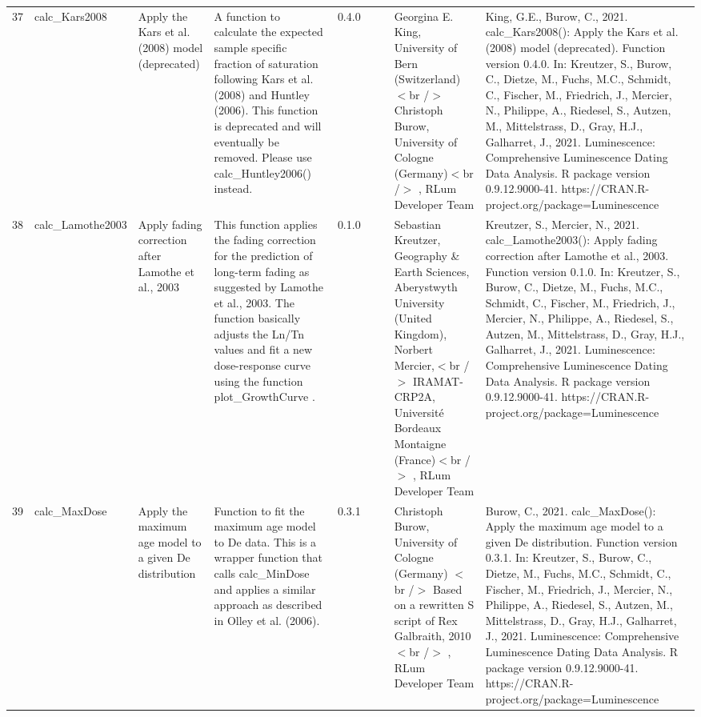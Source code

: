 \begin{table}[ht]
\begin{tabular}{rllllllll}
 \\ 
  37 & calc\_Kars2008 & Apply the Kars et al. (2008) model (deprecated) & A function to calculate the expected sample specific fraction of saturation following Kars et al. (2008) and Huntley (2006). This function is deprecated and will eventually be removed. Please use  calc\_Huntley2006()  instead. & 0.4.0
 &  &  & Georgina E. King, University of Bern (Switzerland)  $<$br /$>$ Christoph Burow, University of Cologne (Germany)$<$br /$>$ , RLum Developer Team & King, G.E., Burow, C., 2021. calc\_Kars2008(): Apply the Kars et al. (2008) model (deprecated). Function version 0.4.0. In: Kreutzer, S., Burow, C., Dietze, M., Fuchs, M.C., Schmidt, C., Fischer, M., Friedrich, J., Mercier, N., Philippe, A., Riedesel, S., Autzen, M., Mittelstrass, D., Gray, H.J., Galharret, J., 2021. Luminescence: Comprehensive Luminescence Dating Data Analysis. R package version 0.9.12.9000-41. https://CRAN.R-project.org/package=Luminescence
 \\ 
  38 & calc\_Lamothe2003 & Apply fading correction after Lamothe et al., 2003 & This function applies the fading correction for the prediction of long-term fading as suggested by Lamothe et al., 2003. The function basically adjusts the Ln/Tn values and fit a new dose-response curve using the function  plot\_GrowthCurve . & 0.1.0
 &  &  & Sebastian Kreutzer, Geography \& Earth Sciences, Aberystwyth University (United Kingdom), Norbert Mercier,$<$br /$>$ IRAMAT-CRP2A, Université Bordeaux Montaigne (France)$<$br /$>$ , RLum Developer Team & Kreutzer, S., Mercier, N., 2021. calc\_Lamothe2003(): Apply fading correction after Lamothe et al., 2003. Function version 0.1.0. In: Kreutzer, S., Burow, C., Dietze, M., Fuchs, M.C., Schmidt, C., Fischer, M., Friedrich, J., Mercier, N., Philippe, A., Riedesel, S., Autzen, M., Mittelstrass, D., Gray, H.J., Galharret, J., 2021. Luminescence: Comprehensive Luminescence Dating Data Analysis. R package version 0.9.12.9000-41. https://CRAN.R-project.org/package=Luminescence
 \\ 
  39 & calc\_MaxDose & Apply the maximum age model to a given De distribution & Function to fit the maximum age model to De data. This is a wrapper function that calls  calc\_MinDose  and applies a similar approach as described in Olley et al. (2006). & 0.3.1
 &  &  & Christoph Burow, University of Cologne (Germany)  $<$br /$>$ Based on a rewritten S script of Rex Galbraith, 2010$<$br /$>$ , RLum Developer Team & Burow, C., 2021. calc\_MaxDose(): Apply the maximum age model to a given De distribution. Function version 0.3.1. In: Kreutzer, S., Burow, C., Dietze, M., Fuchs, M.C., Schmidt, C., Fischer, M., Friedrich, J., Mercier, N., Philippe, A., Riedesel, S., Autzen, M., Mittelstrass, D., Gray, H.J., Galharret, J., 2021. Luminescence: Comprehensive Luminescence Dating Data Analysis. R package version 0.9.12.9000-41. https://CRAN.R-project.org/package=Luminescence

\end{tabular}
\end{table}
